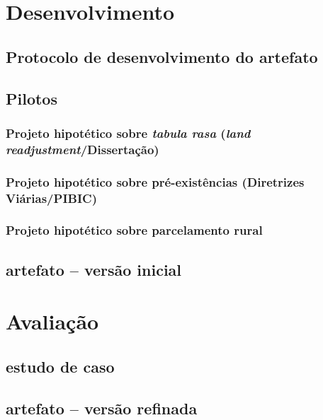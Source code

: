 \documentclass[12pt, a4paper]{book} %
\begin{document}
    \part[Desenvolvimento]{Desenvolvimento}

        \chapter[Protocolo]{Protocolo de desenvolvimento do artefato}

        \chapter[O projeto de traçados hipotéticos]{Pilotos}
            
            \section{Projeto hipotético sobre \textit{tabula rasa} (\textit{land readjustment}/Dissertação)}
            \section{Projeto hipotético sobre pré-existências (Diretrizes Viárias/PIBIC)}
            \section{Projeto hipotético sobre parcelamento rural}

        \chapter[Diretrizes projetuais]{artefato – versão inicial}

    \part[Avaliação]{Avaliação}

        \chapter[Comparativo com existente]{estudo de caso}

        \chapter[Grupos focais e \textit{feedback}]{}

        \chapter[Diretrizes projetuais]{artefato – versão refinada}
\end{document}

